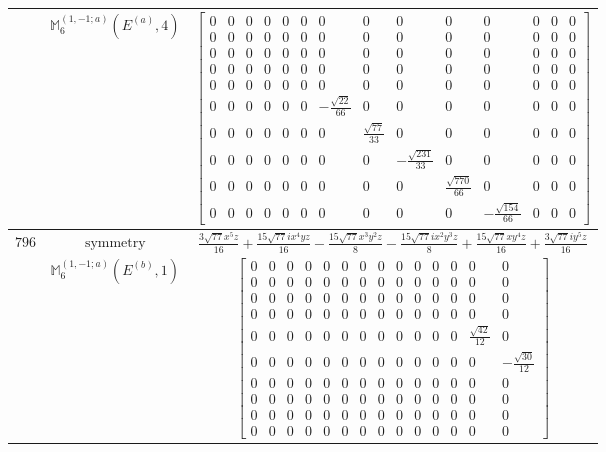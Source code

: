 \documentclass[fleqn,8pt,landscape]{jsarticle}
\begin{document}
\begin{longtable}{ccc}
$  $ & $ \mathbb{M}_{6}^{(1,-1;a)}(E^{(a)},4) $ & $ \begin{bmatrix} 0 & 0 & 0 & 0 & 0 & 0 & 0 & 0 & 0 & 0 & 0 & 0 & 0 & 0 \\ 0 & 0 & 0 & 0 & 0 & 0 & 0 & 0 & 0 & 0 & 0 & 0 & 0 & 0 \\ 0 & 0 & 0 & 0 & 0 & 0 & 0 & 0 & 0 & 0 & 0 & 0 & 0 & 0 \\ 0 & 0 & 0 & 0 & 0 & 0 & 0 & 0 & 0 & 0 & 0 & 0 & 0 & 0 \\ 0 & 0 & 0 & 0 & 0 & 0 & 0 & 0 & 0 & 0 & 0 & 0 & 0 & 0 \\ 0 & 0 & 0 & 0 & 0 & 0 & - \frac{\sqrt{22}}{66} & 0 & 0 & 0 & 0 & 0 & 0 & 0 \\ 0 & 0 & 0 & 0 & 0 & 0 & 0 & \frac{\sqrt{77}}{33} & 0 & 0 & 0 & 0 & 0 & 0 \\ 0 & 0 & 0 & 0 & 0 & 0 & 0 & 0 & - \frac{\sqrt{231}}{33} & 0 & 0 & 0 & 0 & 0 \\ 0 & 0 & 0 & 0 & 0 & 0 & 0 & 0 & 0 & \frac{\sqrt{770}}{66} & 0 & 0 & 0 & 0 \\ 0 & 0 & 0 & 0 & 0 & 0 & 0 & 0 & 0 & 0 & - \frac{\sqrt{154}}{66} & 0 & 0 & 0 \end{bmatrix} $ \\ \hline
$ 796 $ & $ \text{symmetry} $ & $ \frac{3 \sqrt{77} x^{5} z}{16} + \frac{15 \sqrt{77} i x^{4} y z}{16} - \frac{15 \sqrt{77} x^{3} y^{2} z}{8} - \frac{15 \sqrt{77} i x^{2} y^{3} z}{8} + \frac{15 \sqrt{77} x y^{4} z}{16} + \frac{3 \sqrt{77} i y^{5} z}{16} $ \\
$  $ & $ \mathbb{M}_{6}^{(1,-1;a)}(E^{(b)},1) $ & $ \begin{bmatrix} 0 & 0 & 0 & 0 & 0 & 0 & 0 & 0 & 0 & 0 & 0 & 0 & 0 & 0 \\ 0 & 0 & 0 & 0 & 0 & 0 & 0 & 0 & 0 & 0 & 0 & 0 & 0 & 0 \\ 0 & 0 & 0 & 0 & 0 & 0 & 0 & 0 & 0 & 0 & 0 & 0 & 0 & 0 \\ 0 & 0 & 0 & 0 & 0 & 0 & 0 & 0 & 0 & 0 & 0 & 0 & 0 & 0 \\ 0 & 0 & 0 & 0 & 0 & 0 & 0 & 0 & 0 & 0 & 0 & 0 & \frac{\sqrt{42}}{12} & 0 \\ 0 & 0 & 0 & 0 & 0 & 0 & 0 & 0 & 0 & 0 & 0 & 0 & 0 & - \frac{\sqrt{30}}{12} \\ 0 & 0 & 0 & 0 & 0 & 0 & 0 & 0 & 0 & 0 & 0 & 0 & 0 & 0 \\ 0 & 0 & 0 & 0 & 0 & 0 & 0 & 0 & 0 & 0 & 0 & 0 & 0 & 0 \\ 0 & 0 & 0 & 0 & 0 & 0 & 0 & 0 & 0 & 0 & 0 & 0 & 0 & 0 \\ 0 & 0 & 0 & 0 & 0 & 0 & 0 & 0 & 0 & 0 & 0 & 0 & 0 & 0 \end{bmatrix} $ \\ \hline

\end{longtable}
\end{document}
